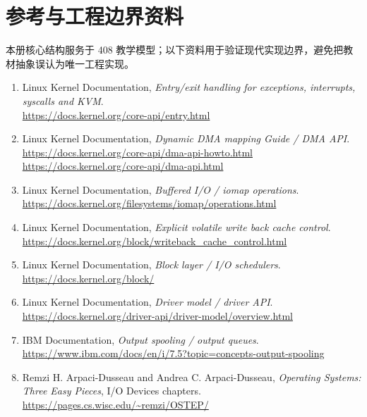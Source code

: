 \documentclass[UTF8,fontset=fandol,11pt,a4paper]{ctexart}
\begin{document}
\section*{参考与工程边界资料}
本册核心结构服务于 408 教学模型；以下资料用于验证现代实现边界，避免把教材抽象误认为唯一工程实现。
\begin{enumerate}
  \item Linux Kernel Documentation, \emph{Entry/exit handling for exceptions, interrupts, syscalls and KVM}.\\
  \url{https://docs.kernel.org/core-api/entry.html}
  \item Linux Kernel Documentation, \emph{Dynamic DMA mapping Guide / DMA API}.\\
  \url{https://docs.kernel.org/core-api/dma-api-howto.html}\\
  \url{https://docs.kernel.org/core-api/dma-api.html}
  \item Linux Kernel Documentation, \emph{Buffered I/O / iomap operations}.\\
  \url{https://docs.kernel.org/filesystems/iomap/operations.html}
  \item Linux Kernel Documentation, \emph{Explicit volatile write back cache control}.\\
  \url{https://docs.kernel.org/block/writeback_cache_control.html}
  \item Linux Kernel Documentation, \emph{Block layer / I/O schedulers}.\\
  \url{https://docs.kernel.org/block/}
  \item Linux Kernel Documentation, \emph{Driver model / driver API}.\\
  \url{https://docs.kernel.org/driver-api/driver-model/overview.html}
  \item IBM Documentation, \emph{Output spooling / output queues}.\\
  \url{https://www.ibm.com/docs/en/i/7.5?topic=concepts-output-spooling}
  \item Remzi H. Arpaci-Dusseau and Andrea C. Arpaci-Dusseau, \emph{Operating Systems: Three Easy Pieces}, I/O Devices chapters.\\
  \url{https://pages.cs.wisc.edu/~remzi/OSTEP/}
\end{enumerate}
\end{document}
